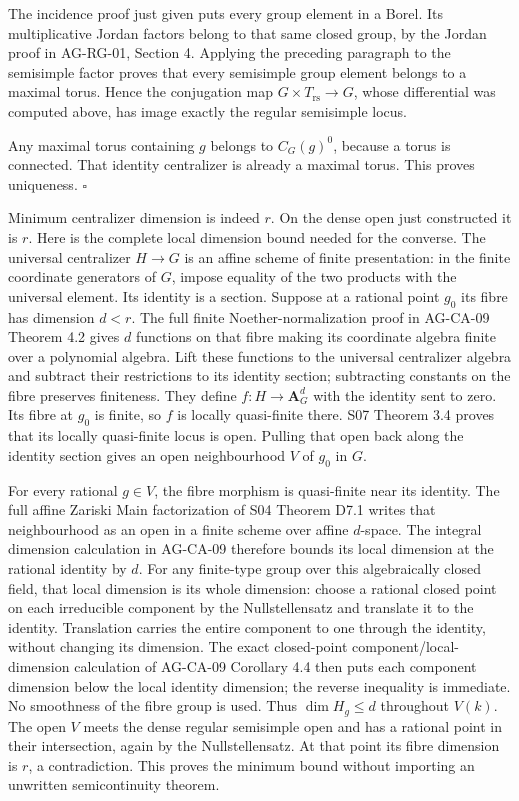 \documentclass[11pt,a4paper,openany]{report}
\begin{document}
The incidence proof just given puts every group element in a Borel. Its multiplicative Jordan factors belong to that same closed group, by the Jordan proof in AG-RG-01, Section 4. Applying the preceding paragraph to the semisimple factor proves that every semisimple group element belongs to a maximal torus. Hence the conjugation map \(G\times T_{\mathrm{rs}}\to G\), whose differential was computed above, has image exactly the regular semisimple locus.

Any maximal torus containing \(g\) belongs to \(C_G(g)^0\), because a torus is connected. That identity centralizer is already a maximal torus. This proves uniqueness. \(\square\)

Minimum centralizer dimension is indeed \(r\). On the dense open just constructed it is \(r\). Here is the complete local dimension bound needed for the converse. The universal centralizer \(H\to G\) is an affine scheme of finite presentation: in the finite coordinate generators of \(G\), impose equality of the two products with the universal element. Its identity is a section. Suppose at a rational point \(g_0\) its fibre has dimension \(d<r\). The full finite Noether-normalization proof in AG-CA-09 Theorem 4.2 gives \(d\) functions on that fibre making its coordinate algebra finite over a polynomial algebra. Lift these functions to the universal centralizer algebra and subtract their restrictions to its identity section; subtracting constants on the fibre preserves finiteness. They define \(f:H\to\mathbf A_G^d\) with the identity sent to zero. Its fibre at \(g_0\) is finite, so \(f\) is locally quasi-finite there. S07 Theorem 3.4 proves that its locally quasi-finite locus is open. Pulling that open back along the identity section gives an open neighbourhood \(V\) of \(g_0\) in \(G\).

For every rational \(g\in V\), the fibre morphism is quasi-finite near its identity. The full affine Zariski Main factorization of S04 Theorem D7.1 writes that neighbourhood as an open in a finite scheme over affine \(d\)-space. The integral dimension calculation in AG-CA-09 therefore bounds its local dimension at the rational identity by \(d\). For any finite-type group over this algebraically closed field, that local dimension is its whole dimension: choose a rational closed point on each irreducible component by the Nullstellensatz and translate it to the identity. Translation carries the entire component to one through the identity, without changing its dimension. The exact closed-point component/local-dimension calculation of AG-CA-09 Corollary 4.4 then puts each component dimension below the local identity dimension; the reverse inequality is immediate. No smoothness of the fibre group is used. Thus \(\dim H_g\le d\) throughout \(V(k)\). The open \(V\) meets the dense regular semisimple open and has a rational point in their intersection, again by the Nullstellensatz. At that point its fibre dimension is \(r\), a contradiction. This proves the minimum bound without importing an unwritten semicontinuity theorem.
\end{document}
